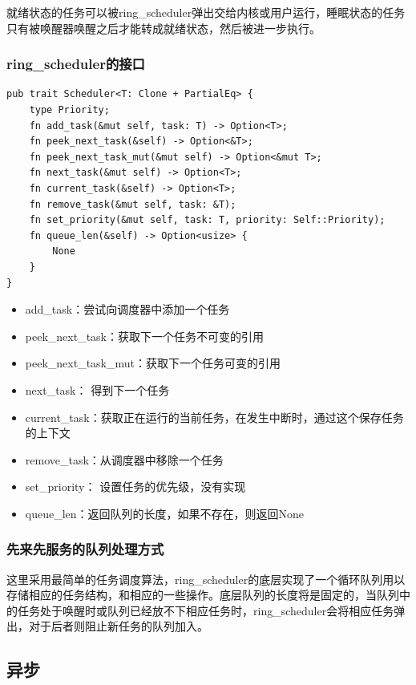 就绪状态的任务可以被ring\_scheduler弹出交给内核或用户运行，睡眠状态的任务只有被唤醒器唤醒之后才能转成就绪状态，然后被进一步执行。

\subsubsection{ring\_scheduler的接口}

\begin{lstlisting}[caption=调度器的接口约束]
pub trait Scheduler<T: Clone + PartialEq> {
    type Priority;
    fn add_task(&mut self, task: T) -> Option<T>;
    fn peek_next_task(&self) -> Option<&T>;
    fn peek_next_task_mut(&mut self) -> Option<&mut T>;
    fn next_task(&mut self) -> Option<T>;
    fn current_task(&self) -> Option<T>;
    fn remove_task(&mut self, task: &T);
    fn set_priority(&mut self, task: T, priority: Self::Priority);
    fn queue_len(&self) -> Option<usize> {
        None
    }
}
\end{lstlisting}


\begin{itemize}
\item add\_task：尝试向调度器中添加一个任务
\item peek\_next\_task：获取下一个任务不可变的引用
\item peek\_next\_task\_mut：获取下一个任务可变的引用
\item next\_task： 得到下一个任务
\item current\_task：获取正在运行的当前任务，在发生中断时，通过这个保存任务的上下文
\item remove\_task：从调度器中移除一个任务
\item set\_priority： 设置任务的优先级，没有实现
\item queue\_len：返回队列的长度，如果不存在，则返回None
\end{itemize}


\subsubsection{先来先服务的队列处理方式}

这里采用最简单的任务调度算法，ring\_scheduler的底层实现了一个循环队列用以存储相应的任务结构，和相应的一些操作。底层队列的长度将是固定的，当队列中的任务处于唤醒时或队列已经放不下相应任务时，ring\_scheduler会将相应任务弹出，对于后者则阻止新任务的队列加入。

\subsection{异步}

